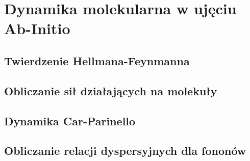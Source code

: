 
\section{Dynamika molekularna w ujęciu Ab-Initio}


\subsection{Twierdzenie Hellmana-Feynmanna}


\subsection{Obliczanie sił działających na molekuły}


\subsection{Dynamika Car-Parinello}


\subsection{Obliczanie relacji dyspersyjnych dla fononów}


